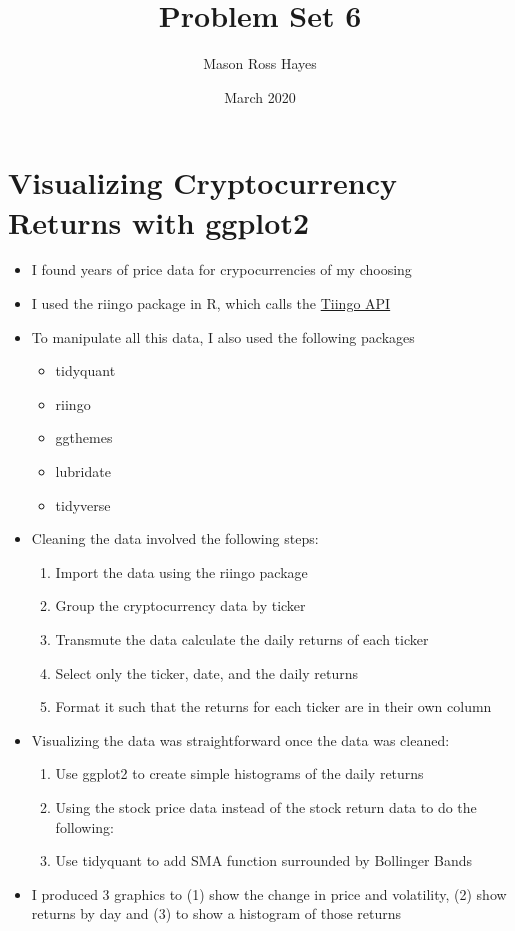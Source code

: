 \documentclass{article}
\title{Problem Set 6}
\author{Mason Ross Hayes}
\date{March 2020}
\begin{document}
\maketitle

\section{Visualizing Cryptocurrency Returns with ggplot2}

\begin{itemize}
    \item I found years of price data for crypocurrencies of my choosing
    \item I used the riingo package in R, which calls the \href{https://api.tiingo.com/documentation/general/overview}{Tiingo API}
    \item To manipulate all this data, I also used the following packages
        \begin{itemize}
            \item tidyquant
            \item riingo
            \item ggthemes
            \item lubridate
            \item tidyverse
        \end{itemize}
    \item Cleaning the data involved the following steps:
        \begin{enumerate}
            \item Import the data using the riingo package
            \item Group the cryptocurrency data by ticker
            \item Transmute the data calculate the daily returns of each ticker
            \item Select only the ticker, date, and the daily returns
            \item Format it such that the returns for each ticker are in their own column
        \end{enumerate}

    \item Visualizing the data was straightforward once the data was cleaned:
        \begin{enumerate}
            \item Use ggplot2 to create simple histograms of the daily returns
            \item Using the stock price data instead of the stock return data to do the following:

        
            \item Use tidyquant to add SMA function surrounded by Bollinger Bands
        \end{enumerate}

    \item I produced 3 graphics to (1) show the change in price and volatility, (2) show returns by day and (3) to show a histogram of those returns
\end{itemize}
\end{document}

